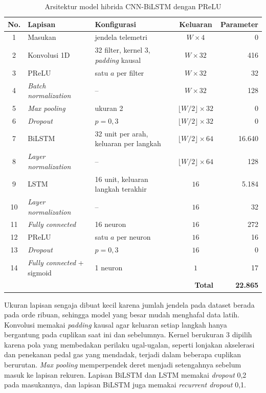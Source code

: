 \begin{table}[H]
  \centering
  \caption{Arsitektur model hibrida CNN-BiLSTM dengan PReLU}
  \label{tab:arsitektur}
  \small
  \begin{tabular}{|c|l|p{4.3cm}|c|r|}
    \hline
    \textbf{No.} & \textbf{Lapisan} & \textbf{Konfigurasi} & \textbf{Keluaran} & \textbf{Parameter} \\
    \hline
    1 & Masukan & jendela telemetri & $W \times 4$ & 0 \\
    \hline
    2 & Konvolusi 1D & 32 filter, kernel 3, \textit{padding} kausal & $W \times 32$ & 416 \\
    \hline
    3 & PReLU & satu $a$ per filter & $W \times 32$ & 32 \\
    \hline
    4 & \textit{Batch normalization} & -- & $W \times 32$ & 128 \\
    \hline
    5 & \textit{Max pooling} & ukuran 2 & $\lfloor W/2 \rfloor \times 32$ & 0 \\
    \hline
    6 & \textit{Dropout} & $p = 0{,}3$ & $\lfloor W/2 \rfloor \times 32$ & 0 \\
    \hline
    7 & BiLSTM & 32 unit per arah, keluaran per langkah & $\lfloor W/2 \rfloor \times 64$ & 16.640 \\
    \hline
    8 & \textit{Layer normalization} & -- & $\lfloor W/2 \rfloor \times 64$ & 128 \\
    \hline
    9 & LSTM & 16 unit, keluaran langkah terakhir & $16$ & 5.184 \\
    \hline
    10 & \textit{Layer normalization} & -- & $16$ & 32 \\
    \hline
    11 & \textit{Fully connected} & 16 neuron & $16$ & 272 \\
    \hline
    12 & PReLU & satu $a$ per neuron & $16$ & 16 \\
    \hline
    13 & \textit{Dropout} & $p = 0{,}3$ & $16$ & 0 \\
    \hline
    14 & \textit{Fully connected} + sigmoid & 1 neuron & $1$ & 17 \\
    \hline
    \multicolumn{4}{|r|}{\textbf{Total}} & \textbf{22.865} \\
    \hline
  \end{tabular}
\end{table}

Ukuran lapisan sengaja dibuat kecil karena jumlah jendela pada dataset berada pada orde ribuan, sehingga model yang besar mudah menghafal data latih. Konvolusi memakai \textit{padding} kausal agar keluaran setiap langkah hanya bergantung pada cuplikan saat ini dan sebelumnya. Kernel berukuran 3 dipilih karena pola yang membedakan perilaku ugal-ugalan, seperti lonjakan akselerasi dan penekanan pedal gas yang mendadak, terjadi dalam beberapa cuplikan berurutan. \textit{Max pooling} memperpendek deret menjadi setengahnya sebelum masuk ke lapisan rekuren. Lapisan BiLSTM dan LSTM memakai \textit{dropout} 0,2 pada masukannya, dan lapisan BiLSTM juga memakai \textit{recurrent dropout} 0,1.

